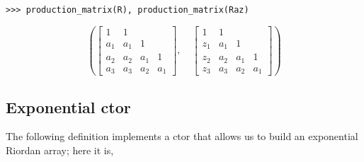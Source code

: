 \begin{example}
\begin{verbatim}
>>> production_matrix(R), production_matrix(Raz)
\end{verbatim}
\begin{displaymath}
\left ( \left[\begin{matrix}1 & 1 &   &  \\a_{1} & a_{1} & 1 &  \\a_{2} & a_{2} & a_{1} & 1\\a_{3} & a_{3} & a_{2} & a_{1}\end{matrix}\right], \quad \left[\begin{matrix}1 & 1 &   &  \\z_{1} & a_{1} & 1 &  \\z_{2} & a_{2} & a_{1} & 1\\z_{3} & a_{3} & a_{2} & a_{1}\end{matrix}\right]\right )
\end{displaymath}
\end{example}

\subsection{Exponential ctor}

The following definition implements a ctor that allows us to build an
exponential Riordan array; here it is,
\inputminted[baselinestretch=0.8,stripnl=false,firstline=23, lastline=24]
    {python}{deps/simulation-methods/src/sequences.py}

